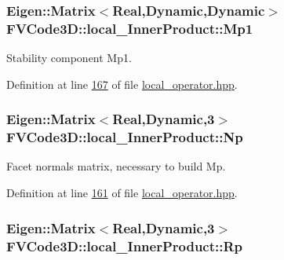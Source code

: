 \subsubsection[{\texorpdfstring{Mp1}{Mp1}}]{\setlength{\rightskip}{0pt plus 5cm}Eigen\+::\+Matrix$<${\bf Real},Dynamic,Dynamic$>$ F\+V\+Code3\+D\+::local\+\_\+\+Inner\+Product\+::\+Mp1\hspace{0.3cm}{\ttfamily [private]}}\hypertarget{classFVCode3D_1_1local__InnerProduct_a6aa515dc796d733d582fc1a3c260bb4c}{}\label{classFVCode3D_1_1local__InnerProduct_a6aa515dc796d733d582fc1a3c260bb4c}


Stability component Mp1. 



Definition at line \hyperlink{local__operator_8hpp_source_l00167}{167} of file \hyperlink{local__operator_8hpp_source}{local\+\_\+operator.\+hpp}.

\subsubsection[{\texorpdfstring{Np}{Np}}]{\setlength{\rightskip}{0pt plus 5cm}Eigen\+::\+Matrix$<${\bf Real},Dynamic,3$>$ F\+V\+Code3\+D\+::local\+\_\+\+Inner\+Product\+::\+Np\hspace{0.3cm}{\ttfamily [private]}}\hypertarget{classFVCode3D_1_1local__InnerProduct_ab1529332657085ba0189352ec057d75d}{}\label{classFVCode3D_1_1local__InnerProduct_ab1529332657085ba0189352ec057d75d}


Facet normals matrix, necessary to build Mp. 



Definition at line \hyperlink{local__operator_8hpp_source_l00161}{161} of file \hyperlink{local__operator_8hpp_source}{local\+\_\+operator.\+hpp}.

\subsubsection[{\texorpdfstring{Rp}{Rp}}]{\setlength{\rightskip}{0pt plus 5cm}Eigen\+::\+Matrix$<${\bf Real},Dynamic,3$>$ F\+V\+Code3\+D\+::local\+\_\+\+Inner\+Product\+::\+Rp\hspace{0.3cm}{\ttfamily [private]}}\hypertarget{classFVCode3D_1_1local__InnerProduct_a47cd5f267a0825f86a1dcce0958ff10f}{}\label{classFVCode3D_1_1local__InnerProduct_a47cd5f267a0825f86a1dcce0958ff10f}


